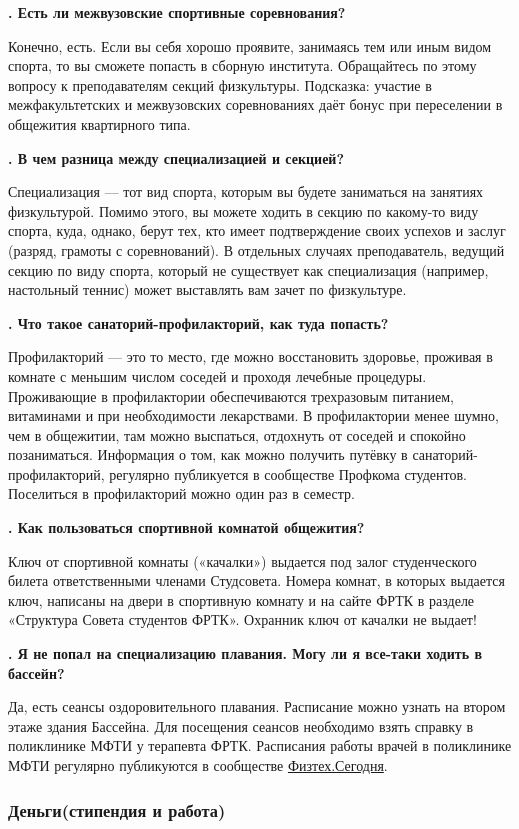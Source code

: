 \documentclass[14pt]{extarticle}
\newcounter{question}
\newcommand\Que[1]{%
    \begin{minipage}{\textwidth}
    \leavevmode\par
    \stepcounter{question}
    \noindent
    {\large\textbf{\thequestion. #1}}\par}
\newcommand\Ans[2][]{%
    \leavevmode\par\noindent
    {\leftskip37pt
    \textbf{#1}#2\par}
    \end{minipage}}
\begin{document}
\Que{Есть ли межвузовские спортивные соревнования?}
\Ans{Конечно, есть. Если вы себя хорошо проявите, занимаясь тем или иным видом спорта, то вы сможете попасть в сборную института. Обращайтесь по этому вопросу к преподавателям секций физкультуры. Подсказка: участие в межфакультетских и межвузовских соревнованиях даёт бонус при переселении в общежития квартирного типа.}

\Que{В чем разница между специализацией и секцией?}
\Ans{Специализация — тот вид спорта, которым вы будете заниматься на занятиях физкультурой. Помимо этого, вы можете ходить в секцию по какому-то виду спорта, куда, однако, берут тех, кто имеет подтверждение своих успехов и заслуг (разряд, грамоты с соревнований). В отдельных случаях преподаватель, ведущий секцию по виду спорта, который не существует как специализация (например, настольный теннис) может выставлять вам зачет по физкультуре.}

\Que{Что такое санаторий-профилакторий, как туда попасть? }
\Ans{Профилакторий — это то место, где можно восстановить здоровье, проживая в комнате с меньшим числом соседей и проходя лечебные процедуры. Проживающие в профилактории обеспечиваются трехразовым питанием, витаминами и при необходимости лекарствами. В профилактории менее шумно, чем в общежитии, там можно выспаться, отдохнуть от соседей и спокойно позаниматься. Информация о том, как можно получить путёвку в санаторий-профилакторий, регулярно публикуется в сообществе Профкома студентов. Поселиться в профилакторий можно один раз в семестр.}

\Que{Как пользоваться спортивной комнатой общежития?}
\Ans{Ключ от спортивной комнаты («качалки») выдается под залог студенческого билета ответственными членами Студсовета. Номера комнат, в которых выдается ключ, написаны на двери в спортивную комнату и на сайте ФРТК в разделе «Структура Совета студентов ФРТК». Охранник ключ от качалки не выдает!}

\Que{Я не попал на специализацию плавания. Могу ли я все-таки ходить в бассейн?}
\Ans{Да, есть сеансы оздоровительного плавания. Расписание можно узнать на втором этаже здания Бассейна. Для посещения сеансов необходимо взять справку в поликлинике МФТИ у терапевта ФРТК. Расписания работы врачей в поликлинике МФТИ регулярно публикуются в сообществе \href{https://vk.com/students_of_mipt}{Физтех.Сегодня}.}

\subsubsection{Деньги(стипендия и работа)}
\end{document}
